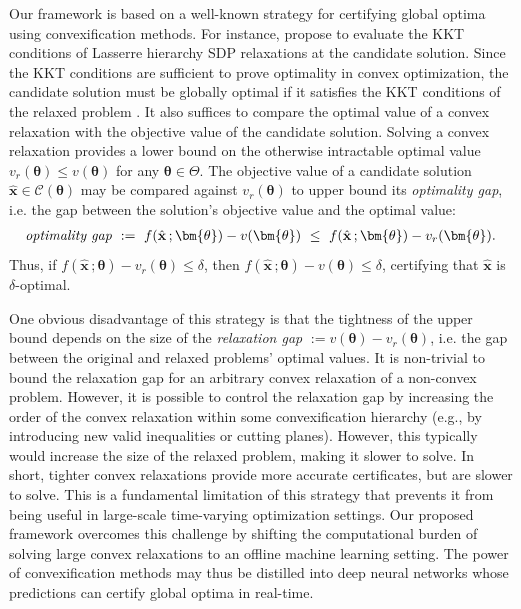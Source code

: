\documentclass[10pt]{article} %
\theoremstyle{plain}
\theoremstyle{definition}
\theoremstyle{remark}
\begin{document}
Our framework is based on a well-known strategy for certifying global optima using convexification methods.
For instance, \citet{xu2021verifying} propose to evaluate the KKT conditions of Lasserre hierarchy SDP relaxations at the candidate solution. Since the KKT conditions are sufficient to prove optimality in convex optimization, the candidate solution must be globally optimal if it satisfies the KKT conditions of the relaxed problem \citep{boyd2004convex}.
It also suffices to compare the optimal value of a convex relaxation with the objective value of the candidate solution.
Solving a convex relaxation provides a lower bound on the otherwise intractable optimal value $v_r(\bm{\theta}) \leq v(\bm{\theta})$ for any $\bm{\theta} \in \Theta$. The objective value of a candidate solution $\hat{\mathbf{x}} \in \mathcal{C}(\bm{\theta})$ may be compared against $v_r(\bm{\theta})$ to upper bound its \textit{optimality gap}, i.e. the gap between the solution's objective value and the optimal value:
\begin{align*}
    \text{\textit{optimality gap}} ~:=~ f(\hat{\mathbf{x}}\, ; \bm{\theta}) - v(\bm{\theta}) ~\leq~ f(\hat{\mathbf{x}}\, ; \bm{\theta}) - v_r(\bm{\theta}).
\end{align*}
Thus, if $f(\hat{\mathbf{x}}\,;\bm{\theta}) - v_r(\bm{\theta}) \leq \delta$, then $f(\hat{\mathbf{x}}\,;\bm{\theta}) - v(\bm{\theta}) \leq \delta$, certifying that $\hat{\mathbf{x}}$ is $\delta$-optimal.

One obvious disadvantage of this strategy is that the tightness of the upper bound depends on the size of the \textit{relaxation gap} $:= v(\bm{\theta}) - v_r(\bm{\theta})$, i.e. the gap between the original and relaxed problems' optimal values. It is non-trivial to bound the relaxation gap for an arbitrary convex relaxation of a non-convex problem. However, it is possible to control the relaxation gap by increasing the order of the convex relaxation within some convexification hierarchy (e.g., by introducing new valid inequalities or cutting planes). However, this typically would increase the size of the relaxed problem, making it slower to solve. In short, tighter convex relaxations provide more accurate certificates, but are slower to solve. This is a fundamental limitation of this strategy that prevents it from being useful in large-scale time-varying optimization settings.
Our proposed framework overcomes this challenge by shifting the computational burden of solving large convex relaxations to an offline machine learning setting.
The power of convexification methods may thus be distilled into deep neural networks whose predictions can certify global optima in real-time.
\end{document}
